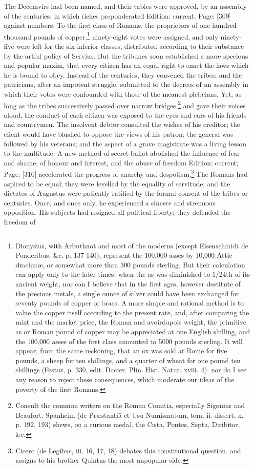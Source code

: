 The Decemvirs had been named, and their tables were approved, by an assembly of the centuries, in which riches preponderated Edition: current; Page: [309] against numbers. To the first class of Romans, the proprietors of one hundred thousand pounds of copper,\footnote{Dionysius, with Arbuthnot and most of the moderns (except Eisenschmidt de Ponderibus, \&c. p. 137-140), represent the 100,000 asses by 10,000 Attic drachmæ, or somewhat more than 300 pounds sterling. But their calculation can apply only to the later times, when the as was diminished to 1/24th of its ancient weight, nor can I believe that in the first ages, however destitute of the precious metals, a single ounce of silver could have been exchanged for seventy pounds of copper or brass. A more simple and rational method is to value the copper itself according to the present rate, and, after comparing the mint and the market price, the Roman and avoirdupois weight, the primitive as or Roman pound of copper may be appreciated at one English shilling, and the 100,000 asses of the first class amounted to 5000 pounds sterling. It will appear, from the same reckoning, that an ox was sold at Rome for five pounds, a sheep for ten shillings, and a quarter of wheat for one pound ten shillings (Festus, p. 330, edit. Dacier. Plin. Hist. Natur. xviii. 4): nor do I see any reason to reject these consequences, which moderate our ideas of the poverty of the first Romans.} ninety-eight votes were assigned, and only ninety-five were left for the six inferior classes, distributed according to their substance by the artful policy of Servius. But the tribunes soon established a more specious and popular maxim, that every citizen has an equal right to enact the laws which he is bound to obey. Instead of the centuries, they convened the tribes; and the patricians, after an impotent struggle, submitted to the decrees of an assembly in which their votes were confounded with those of the meanest plebeians. Yet, as long as the tribes successively passed over narrow bridges,\footnote{Consult the common writers on the Roman Comitia, especially Sigonius and Beaufort. Spanheim (de Præstantiâ et Usu Numismatum, tom. ii. dissert. x. p. 192, 193) shews, on a curious medal, the Cista, Pontes, Septa, Diribitor, \&c.} and gave their voices aloud, the conduct of each citizen was exposed to the eyes and ears of his friends and countrymen. The insolvent debtor consulted the wishes of his creditor; the client would have blushed to oppose the views of his patron; the general was followed by his veterans; and the aspect of a grave magistrate was a living lesson to the multitude. A new method of secret ballot abolished the influence of fear and shame, of honour and interest, and the abuse of freedom Edition: current; Page: [310] accelerated the progress of anarchy and despotism.\footnote{Cicero (de Legibus, iii. 16, 17, 18) debates this constitutional question. and assigns to his brother Quintus the most unpopular side.} The Romans had aspired to be equal; they were levelled by the equality of servitude; and the dictates of Augustus were patiently ratified by the formal consent of the tribes or centuries. Once, and once only, he experienced a sincere and strenuous opposition. His subjects had resigned all political liberty; they defended the freedom of 